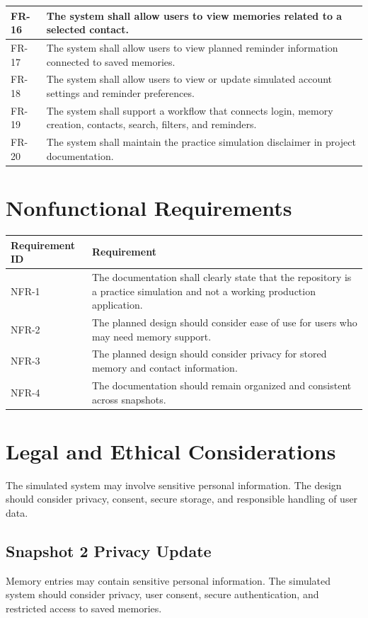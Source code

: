 \documentclass{article}
\begin{document}
\begin{longtable}{|p{3cm}|p{10cm}|}
FR-16 & The system shall allow users to view memories related to a selected contact. \\ \hline
FR-17 & The system shall allow users to view planned reminder information connected to saved memories. \\ \hline
FR-18 & The system shall allow users to view or update simulated account settings and reminder preferences. \\ \hline
FR-19 & The system shall support a workflow that connects login, memory creation, contacts, search, filters, and reminders. \\ \hline
FR-20 & The system shall maintain the practice simulation disclaimer in project documentation. \\ \hline
\end{longtable}

\section{Nonfunctional Requirements}
\begin{longtable}{|p{3cm}|p{10cm}|}
\hline
Requirement ID & Requirement \\ \hline
NFR-1 & The documentation shall clearly state that the repository is a practice simulation and not a working production application. \\ \hline
NFR-2 & The planned design should consider ease of use for users who may need memory support. \\ \hline
NFR-3 & The planned design should consider privacy for stored memory and contact information. \\ \hline
NFR-4 & The documentation should remain organized and consistent across snapshots. \\ \hline
\end{longtable}

\section{Legal and Ethical Considerations}
The simulated system may involve sensitive personal information. The design should consider privacy, consent, secure storage, and responsible handling of user data.

\subsection{Snapshot 2 Privacy Update}

Memory entries may contain sensitive personal information. The simulated system should consider privacy, user consent, secure authentication, and restricted access to saved memories.
\end{document}

